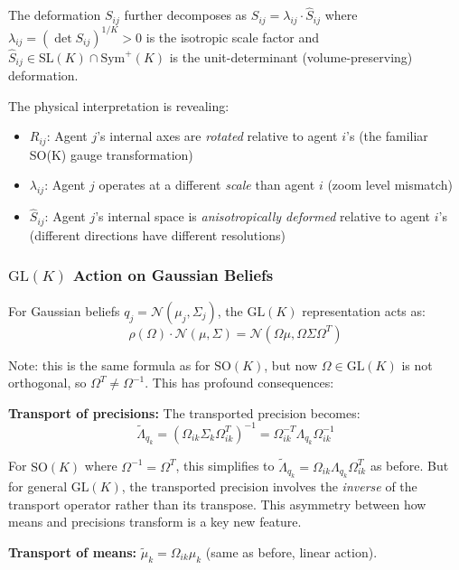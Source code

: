 \documentclass[11pt]{article}
\begin{document}
The deformation $S_{ij}$ further decomposes as $S_{ij} = \lambda_{ij} \cdot \hat{S}_{ij}$ where $\lambda_{ij} = (\det S_{ij})^{1/K} > 0$ is the isotropic scale factor and $\hat{S}_{ij} \in \mathrm{SL}(K) \cap \mathrm{Sym}^+(K)$ is the unit-determinant (volume-preserving) deformation.

The physical interpretation is revealing:
\begin{itemize}
\item $R_{ij}$: Agent $j$'s internal axes are \emph{rotated} relative to agent $i$'s (the familiar SO(K) gauge transformation)
\item $\lambda_{ij}$: Agent $j$ operates at a different \emph{scale} than agent $i$ (zoom level mismatch)
\item $\hat{S}_{ij}$: Agent $j$'s internal space is \emph{anisotropically deformed} relative to agent $i$'s (different directions have different resolutions)
\end{itemize}

\subsubsection{$\mathrm{GL}(K)$ Action on Gaussian Beliefs}

For Gaussian beliefs $q_j = \mathcal{N}(\mu_j, \Sigma_j)$, the $\mathrm{GL}(K)$ representation acts as:
\begin{equation}
\rho(\Omega) \cdot \mathcal{N}(\mu, \Sigma) = \mathcal{N}(\Omega\mu, \Omega\Sigma\Omega^T)
\end{equation}

Note: this is the same formula as for $\mathrm{SO}(K)$, but now $\Omega \in \mathrm{GL}(K)$ is not orthogonal, so $\Omega^T \neq \Omega^{-1}$. This has profound consequences:

\textbf{Transport of precisions:} The transported precision becomes:
\begin{equation}
\tilde{\Lambda}_{q_k} = (\Omega_{ik}\Sigma_k\Omega_{ik}^T)^{-1} = \Omega_{ik}^{-T}\Lambda_{q_k}\Omega_{ik}^{-1}
\end{equation}

For $\mathrm{SO}(K)$ where $\Omega^{-1} = \Omega^T$, this simplifies to $\tilde{\Lambda}_{q_k} = \Omega_{ik}\Lambda_{q_k}\Omega_{ik}^T$ as before. But for general $\mathrm{GL}(K)$, the transported precision involves the \emph{inverse} of the transport operator rather than its transpose. This asymmetry between how means and precisions transform is a key new feature.

\textbf{Transport of means:} $\tilde{\mu}_k = \Omega_{ik}\mu_k$ (same as before, linear action).
\end{document}
